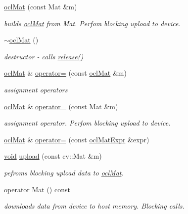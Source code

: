 \begin{DoxyCompactItemize}
\item 
\hyperlink{classcv_1_1ocl_1_1oclMat_ae057b17121bdf3abc744a7e4da310b9f}{ocl\-Mat} (const Mat \&m)
\begin{DoxyCompactList}\small\item\em builds \hyperlink{classcv_1_1ocl_1_1oclMat}{ocl\-Mat} from Mat. Perfom blocking upload to device. \end{DoxyCompactList}\item 
\hyperlink{classcv_1_1ocl_1_1oclMat_ae547fbc3ec1d4768ffcb6e5ba380bc22}{$\sim$ocl\-Mat} ()
\begin{DoxyCompactList}\small\item\em destructor -\/ calls \hyperlink{classcv_1_1ocl_1_1oclMat_a2a0c869ae649fe790de272feb7989b33}{release()} \end{DoxyCompactList}\item 
\hyperlink{classcv_1_1ocl_1_1oclMat}{ocl\-Mat} \& \hyperlink{classcv_1_1ocl_1_1oclMat_a59696d5aa1631f6d1dcd3617efec2fb9}{operator=} (const \hyperlink{classcv_1_1ocl_1_1oclMat}{ocl\-Mat} \&m)
\begin{DoxyCompactList}\small\item\em assignment operators \end{DoxyCompactList}\item 
\hyperlink{classcv_1_1ocl_1_1oclMat}{ocl\-Mat} \& \hyperlink{classcv_1_1ocl_1_1oclMat_afa3a7a89e26bec6c1c881142d93cd751}{operator=} (const Mat \&m)
\begin{DoxyCompactList}\small\item\em assignment operator. Perfom blocking upload to device. \end{DoxyCompactList}\item 
\hyperlink{classcv_1_1ocl_1_1oclMat}{ocl\-Mat} \& \hyperlink{classcv_1_1ocl_1_1oclMat_ab542a679c8aea496338e466f9acf6008}{operator=} (const \hyperlink{classcv_1_1ocl_1_1oclMatExpr}{ocl\-Mat\-Expr} \&expr)
\item 
\hyperlink{legacy_8hpp_a8bb47f092d473522721002c86c13b94e}{void} \hyperlink{classcv_1_1ocl_1_1oclMat_ab117cd9e6b8e6b63571f3cdea44e2277}{upload} (const cv\-::\-Mat \&m)
\begin{DoxyCompactList}\small\item\em pefroms blocking upload data to \hyperlink{classcv_1_1ocl_1_1oclMat}{ocl\-Mat}. \end{DoxyCompactList}\item 
\hyperlink{classcv_1_1ocl_1_1oclMat_a07963db194491e7b8114e83fb6f95666}{operator Mat} () const 
\begin{DoxyCompactList}\small\item\em downloads data from device to host memory. Blocking calls. \end{DoxyCompactList}\item 

\end{DoxyCompactItemize}
